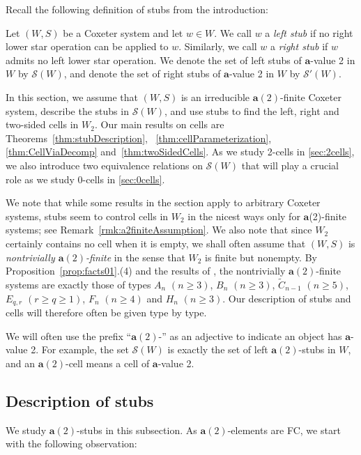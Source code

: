 \documentclass[ALCO,Unicode,published]{cedram}
\newcommand{\cals}{\mathcal{S}}
\newcommand{\la}{\mathbf{a}}
\newcommand{\sw}{\mathcal{S}(W)}
\begin{document}
Recall the following definition of {stubs} from the introduction:
\begin{definition} 
\label{def:stubs} Let $(W,S)$ be a Coxeter system and let $w\in W$. We call $w$ a \emph{left stub} if no right
      lower star operation can be applied to $w$. Similarly, we call $w$ a \emph{right stub} if $w$ admits no left
      lower star operation. We denote the set of left stubs of $\la$-value 2 in $W$ by $\sw$, and denote the set of
      right stubs of $\la$-value 2 in $W$ by $\cals'(W)$.
\end{definition} 

In this section, we assume that $(W,S)$ is an irreducible $\la(2)$-finite Coxeter system, describe
the stubs in $\sw$, and use stubs to find the left, right and two-sided cells in $W_2$. Our main
results on cells are Theorems~\ref{thm:stubDescription}, ~\ref{thm:cellParameterization},
\ref{thm:CellViaDecomp} and~\ref{thm:twoSidedCells}. As we study 2-cells in \autoref{sec:2cells}, we
also introduce two equivalence relations on $\sw$ that will play a crucial role as we study 0-cells
in \autoref{sec:0cells}.  

We note that while some results in the section apply to arbitrary Coxeter systems, stubs seem to
control cells in $W_2$ in the nicest ways only for $\la$(2)-finite systems; see
Remark~\ref{rmk:a2finiteAssumption}.  We also note that since $W_2$ certainly contains no cell when it is
empty, we shall often assume that $(W,S)$ is \emph{nontrivially $\la(2)$-finite} in the sense that
$W_2$ is finite but nonempty.  By Proposition~\ref{prop:facts01}.(4) and the results of \cite{GreenXu}, the
nontrivially $\la(2)$-finite systems are exactly those of types $A_n$ $(n\ge 3)$, $B_n$ $(n\ge 3)$, $\tilde
C_{n-1}$ $(n\ge 5)$, $E_{q,r}$ $(r\ge q\ge 1)$, $F_n$ $(n\ge 4)$ and $H_n$ $(n\ge 3)$. Our description of stubs
and cells will therefore often be given type by type. 

We will often use the prefix ``$\la(2)$-'' as an adjective to indicate an object has $\la$-value 2.
For example, the set $\sw$ is exactly the set of left $\la(2)$-stubs in $W$, and an $\la(2)$-cell
means a cell of $\la$-value 2.

\subsection{Description of stubs}
\label{sec:StubDescriptions} 
We study {$\la(2)$-stubs} in this subsection. As $\la(2)$-elements are FC, we start with the
following observation:
\end{document}
